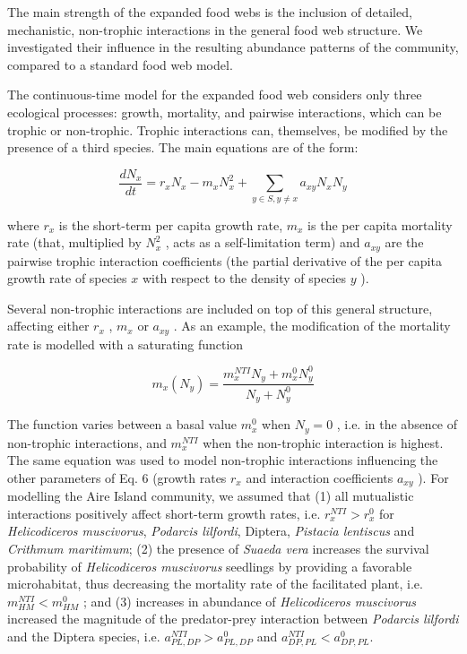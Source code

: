 The main strength of the expanded food webs is the inclusion of detailed, mechanistic, non-trophic interactions in the general food web structure. We investigated their influence in the resulting abundance patterns of the community, compared to a standard food web model.

The continuous-time model for the expanded food web considers only three ecological processes: growth, mortality, and pairwise interactions, which can be trophic or non-trophic. Trophic interactions can, themselves, be modified by the presence of a third species. The main equations are of the form:

\begin{equation} \label{eq:2.4}
\frac{\mathit{dN}_x}{\mathit{dt}}=r_xN_x-m_xN_x^2+\sum _{y{\in}S,y{\neq}x}a_{\mathit{xy}}N_xN_y
\end{equation}

where  $r_x$  is the short-term per capita growth rate,  $m_x$ is the per capita mortality rate (that, multiplied by  $N_x^2$  , acts as a self-limitation term) and  $a_{\mathit{xy}}$  are the pairwise trophic interaction coefficients (the partial derivative of the per capita growth rate of species  $x$  with respect to the density of species  $y$  ).

Several non-trophic interactions are included on top of this general structure, affecting either  $r_x$ ,  $m_x$ or  $a_{\mathit{xy}}$ . As an example, the modification of the mortality rate is modelled with a saturating function \citep{Kefi2012}

\begin{equation} \label{eq:2.5}
m_x\left(N_y\right)=\frac{m_x^{\mathit{NTI}}N_y+m_x^0N_y^0}{N_y+N_y^0}
\end{equation}

The function varies between a basal value $m_x^0$ when $N_y=0$ , i.e. in the absence of non-trophic interactions, and  $m_x^{\mathit{NTI}}$ when the non-trophic interaction is highest. The same equation was used to model non-trophic interactions influencing the other parameters of Eq. 6 (growth rates  $r_x$ and interaction coefficients  $a_{\mathit{xy}}$ ). For modelling the Aire Island community, we assumed that (1) all mutualistic interactions positively affect short-term growth rates, i.e. $r_x^{\mathit{NTI}}>r_x^0$ for \textit{Helicodiceros muscivorus}, \textit{Podarcis lilfordi}, Diptera, \textit{Pistacia lentiscus} and \textit{Crithmum maritimum}; (2) the presence of \textit{Suaeda vera} increases the survival probability of \textit{Helicodiceros muscivorus} seedlings by providing a favorable microhabitat, thus decreasing the mortality rate of the facilitated plant, i.e. $m_{\mathit{HM}}^{\mathit{NTI}}<m_{\mathit{HM}}^0$ ; and (3) increases in abundance of \textit{Helicodiceros muscivorus} increased the magnitude of the predator-prey interaction between \textit{Podarcis lilfordi} and the Diptera species, i.e. $a_{\mathit{PL},\mathit{DP}}^{\mathit{NTI}}>a_{\mathit{PL},\mathit{DP}}^0$ and $a_{\mathit{DP},\mathit{PL}}^{\mathit{NTI}}<a_{\mathit{DP},\mathit{PL}}^0$.

